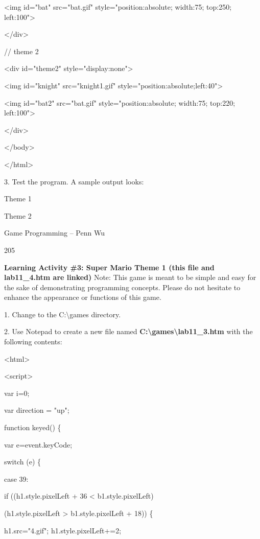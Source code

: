 \documentclass[
]{article}
\begin{document}
\textless img id="bat" src="bat.gif" style="position:absolute; width:75;
top:250; left:100"\textgreater{}

\textless/div\textgreater{}

// theme 2

\textless div id="theme2" style="display:none"\textgreater{}

\textless img id="knight" src="knight1.gif"
style="position:absolute;left:40"\textgreater{}

\textless img id="bat2" src="bat.gif" style="position:absolute;
width:75; top:220; left:100"\textgreater{}

\textless/div\textgreater{}

\textless/body\textgreater{}

\textless/html\textgreater{}

3. Test the program. A sample output looks:

Theme 1

Theme 2

Game Programming -- Penn Wu

205

\protect\hypertarget{index_split_011.htmlux5cux23p206}{}{}

\textbf{Learning Activity \#3: Super Mario Theme 1 (this file and
lab11\_4.htm are linked)} Note: This game is meant to be simple and easy
for the sake of demonstrating programming concepts. Please do not
hesitate to enhance the appearance or functions of this game.

1. Change to the C:\textbackslash games directory.

2. Use Notepad to create a new file named
\textbf{C:\textbackslash games\textbackslash lab11\_3.htm} with the
following contents:

\textless html\textgreater{}

\textless script\textgreater{}

var i=0;

var direction = "up";

function keyed() \{

var e=event.keyCode;

switch (e) \{

case 39:

if ((h1.style.pixelLeft + 36 \textless{} b1.style.pixelLeft)
\textbar\textbar{}

(h1.style.pixelLeft \textgreater{} b1.style.pixelLeft + 18)) \{

h1.src="4.gif"; h1.style.pixelLeft+=2;
\end{document}

